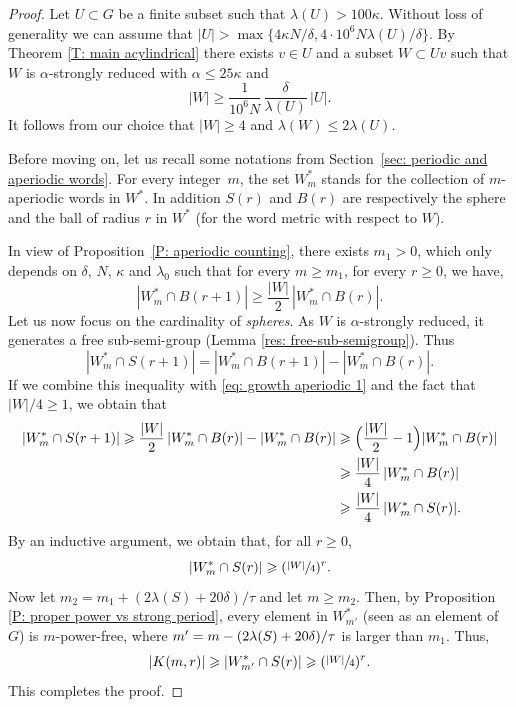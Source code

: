 \documentclass[JEP,XML,SOM,Unicode, NoEqCountersInSection,published]{cedram}
\theoremstyle{plain}
\theoremstyle{definition}
\begin{document}
\begin{proof} Let $U\subset G$ be a finite subset such that $\lambda(U)>100 \kappa$.
Without loss of generality we can assume that $|U| > \max\{4\kappa N/\delta, 4\cdot 10^6 N \lambda(U)/\delta\}$.
By Theorem \ref{T: main acylindrical} there exists $v \in U$ and a subset $W \subset Uv$ such that $W$ is $\alpha$-strongly reduced with $\alpha \leq 25\kappa$ and
\begin{equation*}
|W| \geq \frac 1{10^6N}\,\frac \delta{\lambda(U)}\, |U|.
\end{equation*}
It follows from our choice that $|W| \geq 4$ and $\lambda(W) \leq 2 \lambda(U)$.

Before moving on, let us recall some notations from Section~\ref{sec: periodic and aperiodic words}.
For every integer~$m$, the set $W^*_m$ stands for the collection of $m$-aperiodic words in $W^*$.
In addition $S(r)$ and $B(r)$ are respectively the sphere and the ball of radius $r$ in $W^*$ (for the word metric with respect to $W$).

In view of Proposition~\ref{P: aperiodic counting}, there exists $m_1 > 0$, which only depends on $\delta$, $N$, $\kappa$ and $\lambda_0$ such that for every $m \geq m_1$, for every $r \geq 0$, we have,
\begin{equation}
|W^*_m \cap B(r+1)| \geqslant \frac{|W|}2\, |W^*_m \cap B(r)|. \label{eq: growth aperiodic 1}
\end{equation}
Let us now focus on the cardinality of \emph{spheres}.
As $W$ is $\alpha$-strongly reduced, it generates a free sub-semi-group (Lemma \ref{res: free-sub-semigroup}). Thus
\[
|W_m^* \cap S(r+1)| = |W^*_m\cap B(r+1)| -|W_m^* \cap B(r)|.
\]
If we combine this inequality with \eqref{eq: growth aperiodic 1} and the fact that $|W|/4\geqslant 1$, we obtain that
\begin{align*}
|W^*_m \cap S(r+1)|
\geqslant \frac{|W|}2\, |W^*_m \cap B(r)| -|W_m^* \cap B(r)|
&\geqslant \Bigl(\frac{|W|}{2} -1\Bigr) |W^*_m \cap B(r)| \\
& \geqslant \frac{|W|}4\, |W^*_m \cap B(r)| \\
& \geqslant \frac{|W|}4\, |W^*_m \cap S(r)| .
\end{align*}
By an inductive argument, we obtain that, for all $r\geqslant 0$,
\begin{equation*}
|W^*_m \cap S(r)| \geqslant(\sfrac{|W|}{4})^r.
\end{equation*}
Now let $m_2=m_1+(2\lambda(S) + 20\delta)/\tau$ and let $m\geqslant m_2$.
Then, by Proposition \ref{P: proper power vs strong period}, every element in $W^*_{m'}$ (seen as an element of $G$) is $m$-power-free, where $m'=m-(2\lambda(S) +\nobreak 20\delta)/\tau$ is larger than $m_1$.
Thus,
\begin{equation*}
|K(m,r)|\geqslant |W^*_{m'} \cap S(r)| \geqslant(\sfrac{|W|}{4})^{r}.
\end{equation*}
This completes the proof.
\end{proof}
\end{document}
